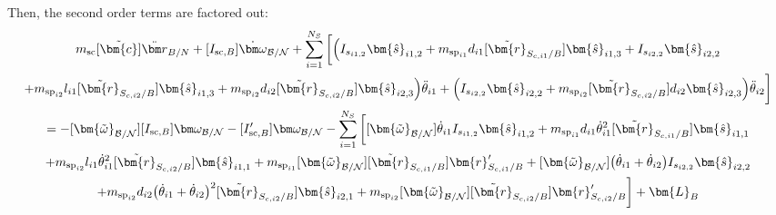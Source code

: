 Then, the second order terms are factored out:
\begin{multline}
	m_{\text{sc}} [\tilde{\bm{c}}] \ddot{\bm r}_{B/N} + [I_{\text{sc},B}] \dot{\bm\omega}_{\cal B/N} + \sum\limits_{i=1}^{N_S} \bigg[\Big(
	I_{s_{i1,2}}\bm{\hat{s}}_{i1,2}
	+m_{\text{sp}_{i1}} d_{i1} [\tilde{\bm{r}}_{S_{c,i1}/B}] \bm{\hat{s}}_{i1,3} + I_{s_{i2,2}}\bm{\hat{s}}_{i2,2} \\
	+m_{\text{sp}_{i2}} l_{i1} [\tilde{\bm{r}}_{S_{c,i2}/B}] \bm{\hat{s}}_{i1,3}
	+m_{\text{sp}_{i2}} d_{i2} [\tilde{\bm{r}}_{S_{c,i2}/B}] \bm{\hat{s}}_{i2,3}\Big) \ddot{\theta}_{i1}
	+\Big(I_{s_{i2,2}}\bm{\hat{s}}_{i2,2}
	+m_{\text{sp}_{i2}} [\tilde{\bm{r}}_{S_{c,i2}/B}] d_{i2}\bm{\hat{s}}_{i2,3}\Big) \ddot{\theta}_{i2} \bigg]\\
	= -[\bm{\tilde{\omega}}_{\cal B/N}] [I_{\text{sc},B}] \bm\omega_{\cal B/N} - [I'_{\text{sc},B}] \bm\omega_{\cal B/N}
	-  \sum\limits_{i=1}^{N_S} \bigg[
	[\bm{\tilde{\omega}}_{\cal B/N}] \dot{\theta}_{i1} I_{s_{i1,2}}\bm{\hat{s}}_{i1,2}
	+m_{\text{sp}_{i1}} d_{i1} \dot{\theta}_{i1}^2 [\tilde{\bm{r}}_{S_{c,i1}/B}] \bm{\hat{s}}_{i1,1}
	\\+m_{\text{sp}_{i2}} l_{i1} \dot{\theta}_{i1}^2 [\tilde{\bm{r}}_{S_{c,i2}/B}] \bm{\hat{s}}_{i1,1}
	+m_{\text{sp}_{i1}} [\bm{\tilde{\omega}}_{\cal B/N}] [\tilde{\bm{r}}_{S_{c,i1}/B}] \bm{r}'_{S_{c,i1}/B}
	+ [\bm{\tilde{\omega}}_{\cal B/N}] \big(\dot{\theta}_{i1}+\dot{\theta}_{i2}\big) I_{s_{i2,2}}\bm{\hat{s}}_{i2,2}
	\\
	+m_{\text{sp}_{i2}} d_{i2}\big(\dot{\theta}_{i1} + \dot{\theta}_{i2}\big)^2 [\tilde{\bm{r}}_{S_{c,i2}/B}] \bm{\hat{s}}_{i2,1}
	+m_{\text{sp}_{i2}} [\bm{\tilde{\omega}}_{\cal B/N}] [\tilde{\bm{r}}_{S_{c,i2}/B}] \bm{r}'_{S_{c,i2}/B}\bigg]
	+ \bm{L}_B
	\label{eq:Finalint}
\end{multline}

